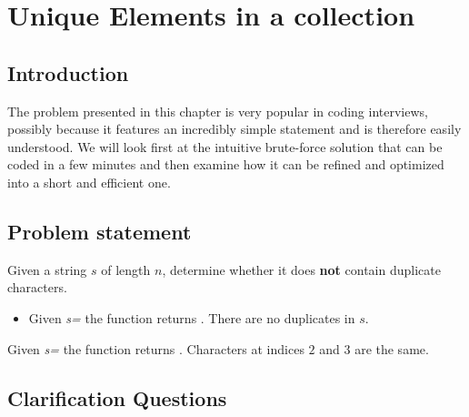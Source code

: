 %


\chapter{Unique Elements in a collection}
\label{ch:unique_elements}
\section*{Introduction}
The problem presented in this chapter is very popular in coding interviews, 
possibly because it features an incredibly simple statement and is therefore easily understood.
We will look first at the intuitive brute-force solution that can be coded in a few minutes and then examine how it 
can be refined and optimized into a short and efficient one. 

\section{Problem statement}
\begin{exercise}
Given a string $s$ of length $n$, determine whether it does \textbf{not} contain duplicate characters. 

\begin{example}
\hfill
	\begin{itemize}
		\item Given \textit{s=} the function returns . There are no duplicates  in $s$.
	\end{itemize}
\end{example}

	\begin{example}
		Given \textit{s=} the function returns . Characters at indices $2$ and $3$  are the same.
	\end{example}

\end{exercise}

\section{Clarification Questions}


